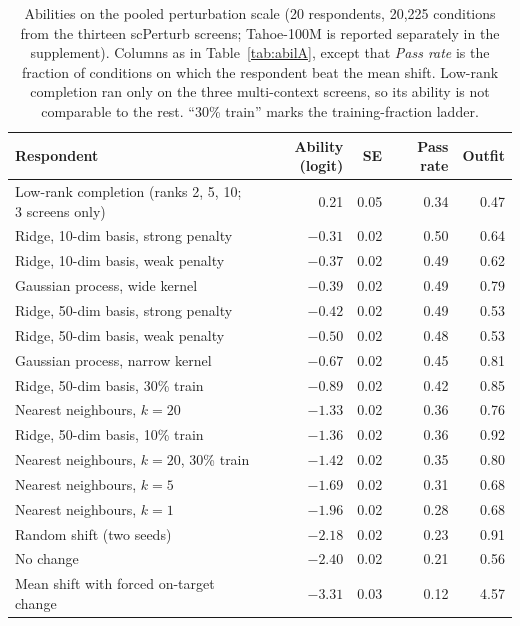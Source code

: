 \documentclass[11pt]{article}
\begin{document}
\begin{table}[t]
\centering
\small
\caption{Abilities on the pooled perturbation scale (20 respondents, 20,225 conditions from
the thirteen scPerturb screens; Tahoe-100M is reported separately in the supplement).
Columns as in Table~\ref{tab:abilA}, except that \emph{Pass rate} is the fraction of
conditions on which the respondent beat the mean shift. Low-rank completion ran only on the
three multi-context screens, so its ability is not comparable to the rest. ``30\% train''
marks the training-fraction ladder.}
\label{tab:abilB}
\begin{tabular}{@{}lrrrr@{}}
\toprule
Respondent & Ability (logit) & SE & Pass rate & Outfit \\
\midrule
Low-rank completion (ranks 2, 5, 10; 3 screens only) & 0.21 & 0.05 & 0.34 & 0.47 \\
Ridge, 10-dim basis, strong penalty & $-0.31$ & 0.02 & 0.50 & 0.64 \\
Ridge, 10-dim basis, weak penalty & $-0.37$ & 0.02 & 0.49 & 0.62 \\
Gaussian process, wide kernel & $-0.39$ & 0.02 & 0.49 & 0.79 \\
Ridge, 50-dim basis, strong penalty & $-0.42$ & 0.02 & 0.49 & 0.53 \\
Ridge, 50-dim basis, weak penalty & $-0.50$ & 0.02 & 0.48 & 0.53 \\
Gaussian process, narrow kernel & $-0.67$ & 0.02 & 0.45 & 0.81 \\
Ridge, 50-dim basis, 30\% train & $-0.89$ & 0.02 & 0.42 & 0.85 \\
Nearest neighbours, $k=20$ & $-1.33$ & 0.02 & 0.36 & 0.76 \\
Ridge, 50-dim basis, 10\% train & $-1.36$ & 0.02 & 0.36 & 0.92 \\
Nearest neighbours, $k=20$, 30\% train & $-1.42$ & 0.02 & 0.35 & 0.80 \\
Nearest neighbours, $k=5$ & $-1.69$ & 0.02 & 0.31 & 0.68 \\
Nearest neighbours, $k=1$ & $-1.96$ & 0.02 & 0.28 & 0.68 \\
Random shift (two seeds) & $-2.18$ & 0.02 & 0.23 & 0.91 \\
No change & $-2.40$ & 0.02 & 0.21 & 0.56 \\
Mean shift with forced on-target change & $-3.31$ & 0.03 & 0.12 & 4.57 \\
\bottomrule
\end{tabular}
\end{table}
\end{document}
